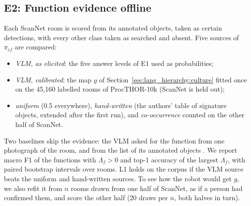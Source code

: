 \subsection{E2: Function evidence offline}
\label{sec:experiments:e2}

Each ScanNet room is scored from its annotated objects, taken as certain detections, with every other class taken
as searched and absent. Five sources of $\pi_{cf}$ are compared:
\begin{itemize}
    \item \emph{VLM, as elicited}: the five answer levels of E1 used as probabilities;
    \item \emph{VLM, calibrated}: the map $g$ of Section~\ref{sec:lang_hierarchy:culture} fitted once on the 45{,}160
          labelled rooms of ProcTHOR-10k (ScanNet is held out);
    \item \emph{uniform} (0.5 everywhere), \emph{hand-written} (the authors' table of signature objects, extended
          after the first run), and \emph{co-occurrence} counted on the other half of ScanNet.
\end{itemize}
Two baselines skip the evidence: the VLM asked for the function from one photograph of the room, and from the list
of its annotated objects \cite{chen2022leveraging}. We report macro F1 of the functions with $\Lambda_f > 0$ and
top-1 accuracy of the largest $\Lambda_f$, with paired bootstrap intervals over rooms. L1 holds on the corpus if the
VLM source beats the uniform and hand-written sources. To see how the robot would get $g$, we also refit it from
$n$ rooms drawn from one half of ScanNet, as if a person had confirmed them, and score the other half (20 draws per
$n$, both halves in turn).

